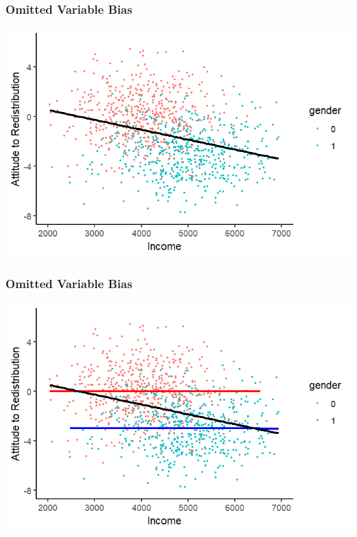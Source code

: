 \documentclass[xcolor=x11names,compress]{beamer}\usepackage[]{graphicx}\usepackage[]{color}
\makeatletter
\def\maxwidth{ %
  \ifdim\Gin@nat@width>\linewidth
    \linewidth
  \else
    \Gin@nat@width
  \fi
}
\newenvironment{knitrout}{}{} %
\renewcommand{\(}{\begin{columns}}
\renewcommand{\)}{\end{columns}}
\newcommand{\<}[1]{\begin{column}{#1}}
\renewcommand{\>}{\end{column}}
\makeatother
\begin{document}
\begin{frame}
\frametitle{Omitted Variable Bias}
\begin{knitrout}
\color{fgcolor}
\includegraphics[width=\maxwidth]{figure/confound2-1} 

\end{knitrout}
\end{frame}


\begin{frame}
\frametitle{Omitted Variable Bias}
\begin{knitrout}
\color{fgcolor}
\includegraphics[width=\maxwidth]{figure/confound3-1} 

\end{knitrout}
\end{frame}
\end{document}
